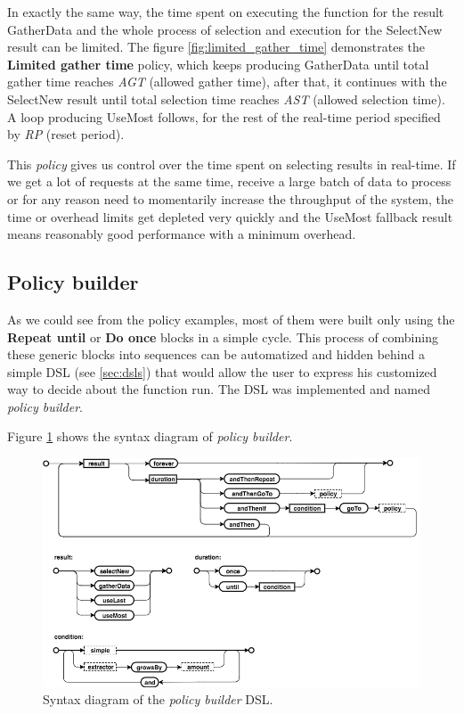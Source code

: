 In exactly the same way, the time spent on executing the function for the result GatherData and the whole process of selection and execution for the SelectNew result can be limited. The figure \ref{fig:limited_gather_time} demonstrates the \textbf{Limited gather time} policy, which keeps producing GatherData until total gather time reaches \textit{AGT} (allowed gather time), after that, it continues with the SelectNew result until total selection time reaches \textit{AST} (allowed selection time). A loop producing UseMost follows, for the rest of the real-time period specified by \textit{RP} (reset period).

This \textit{policy} gives us control over the time spent on selecting results in real-time. If we get a lot of requests at the same time, receive a large batch of data to process or for any reason need to momentarily increase the throughput of the system, the time or overhead limits get depleted very quickly and the UseMost fallback result means reasonably good performance with a minimum overhead.

\subsection{Policy builder}

As we could see from the policy examples, most of them were built only using the \textbf{Repeat until} or \textbf{Do once} blocks in a simple cycle. This process of combining these generic blocks into sequences can be automatized and hidden behind a simple DSL (see \ref{sec:dsls}) that would allow the user to express his customized way to decide about the function run. The DSL was implemented and named \textit{policy builder}.

Figure \ref{fig:policy_builder_chart} shows the syntax diagram of \textit{policy builder}.

\begin{figure}[h!]
	\captionsetup{justification=centering,margin=0.5cm}
	\centerline{\mbox{\includegraphics[width=130mm]{./img/policy_builder_chart.png}}}
	\caption{Syntax diagram of the \textit{policy builder} DSL.}
	\label{fig:policy_builder_chart}
\end{figure}

